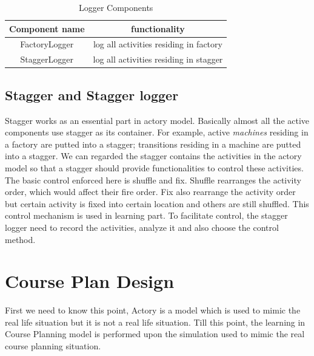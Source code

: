 \documentclass{sig-alternate}
\begin{document}
\begin{table}[h]
\centering
\caption{Logger Components  }
\begin{tabular}{|c|c|}\hline
Component name & functionality  \\
\hline
FactoryLogger & log all activities residing in factory\\
\hline
StaggerLogger & log all activities residing in stagger\\
\hline

\end{tabular}
\end{table}



\subsection{Stagger and Stagger logger}
Stagger works as an essential part in actory model.  Basically almost all the active components use stagger as its container. For example, active {\em machines} residing in  a factory are putted into a stagger; transitions residing in a machine are putted into a stagger.  We can regarded the stagger contains the activities in the actory model so that a stagger should provide functionalities to control these activities. The basic control enforced here is shuffle and fix.  Shuffle rearranges the activity order, which would affect their fire order. Fix also rearrange the activity order but certain activity is fixed into certain location and others are still shuffled. This control mechanism is used in learning part.   To facilitate control, the stagger logger need to record the activities, analyze it and also choose the control method. 

\section{Course Plan Design}
First we need to know this point, Actory is a model which is used to mimic the real life situation but it is not a real life situation.  Till this point, the learning in Course Planning model is performed upon the simulation used to mimic the real course planning situation.  
\end{document}
